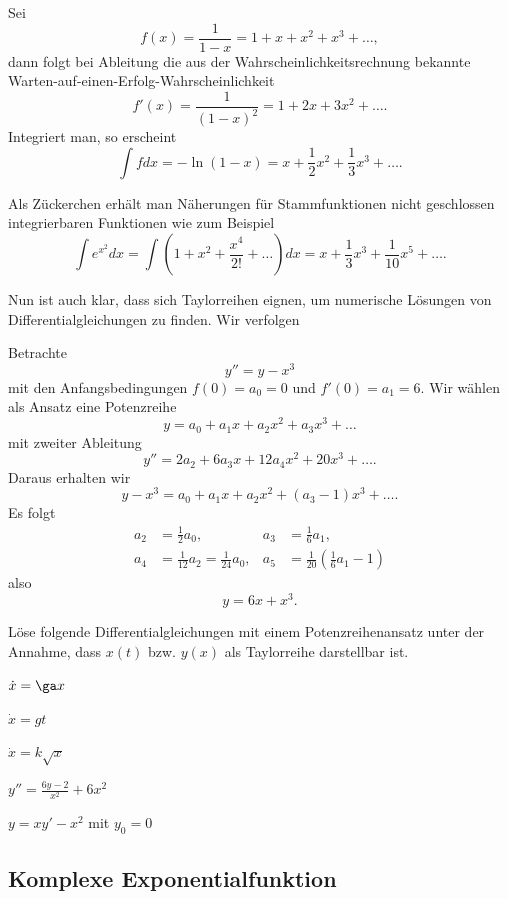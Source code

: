 \documentclass[%
draft,
11pt,%
twoside,%
titlepage,%
german,%
headsepline%
]{scrartcl}
\begin{document}
\begin{bsp}
Sei
$$f(x)=\frac{1}{1-x}=1+x+x^2+x^3+\dots,$$
dann folgt bei Ableitung die aus der Wahrscheinlichkeitsrechnung bekannte \glqq Warten-auf-einen-Erfolg-Wahrscheinlichkeit\grqq
$$f'(x)=\frac{1}{(1-x)^2}=1+2x+3x^2+\dots.$$
Integriert man, so erscheint
$$\int f dx=-\ln(1-x)=x+\frac{1}{2}x^2+\frac{1}{3}x^3+\dots.$$
\end{bsp}

\begin{bem}
Als Z\"uckerchen erh\"alt man N\"aherungen f\"ur Stammfunktionen nicht geschlossen integrierbaren Funktionen wie zum Beispiel
$$
\int e^{x^2}dx =\int\left(1+x^2+\frac{x^4}{2!}+\dots\right)dx=x+\frac{1}{3}x^3+\frac{1}{10}x^5+\dots.
$$
\end{bem}

Nun ist auch klar, dass sich Taylorreihen eignen, um numerische L\"osungen von Differentialgleichungen zu finden. Wir verfolgen
\begin{bsp}
Betrachte
$$y''=y-x^3$$
mit den Anfangsbedingungen $f(0)=a_0=0$ und $f'(0)=a_1=6$. Wir w\"ahlen als Ansatz eine Potenzreihe
$$y=a_0+a_1x+a_2x^2+a_3x^3+\dots$$
mit zweiter Ableitung
$$y''=2a_2+6a_3x+12a_4x^2+20x^3+\dots.$$
Daraus erhalten wir
$$y-x^3=a_0+a_1x+a_2x^2+(a_3-1)x^3+\dots.$$
Es folgt
\begin{align*}
a_2&=\frac{1}{2}a_0, &a_3&=\frac{1}{6}a_1,\\
a_4&=\frac{1}{12}a_2=\frac{1}{24}a_0, &a_5&=\frac{1}{20}(\frac{1}{6}a_1-1)
\end{align*}
also
$$y=6x+x^3.$$
\end{bsp}

\begin{ueb}
L\"ose folgende Differentialgleichungen mit einem Potenzreihenansatz unter der Annahme, dass $x(t)$ bzw. $y(x)$ als Taylorreihe darstellbar ist.
\begin{enumeratea}
\item $\dot{x}=\ga x$
\item $\dot{x}=gt$
\item $\dot{x}=k\sqrt{x}$
\item $y''=\frac{6y-2}{x^2}+6x^2$
\item $y=xy'-x^2$ mit $y_0=0$
\end{enumeratea}
\end{ueb}

\subsection{Komplexe Exponentialfunktion}
\end{document}
